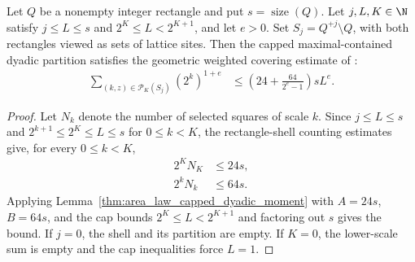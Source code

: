 \begin{lemma}
    \label{thm:area_law_rectangle_shell_weighted_cover}
    \leanok
    Let $Q$ be a nonempty integer rectangle and put $s=\operatorname{size}(Q)$. Let $j,L,K\in\N$
    satisfy $j\le L\le s$ and $2^K\le L<2^{K+1}$, and let $e>0$.
    Set $S_j=Q^{+j}\setminus Q$, with both rectangles viewed as sets of
    lattice sites. Then the capped maximal-contained dyadic partition satisfies the
    geometric weighted covering estimate of
    \cite[proof of Proposition~9.5, lines~717--729]{OpenAI2026AreaLaw}:
    \begin{align}
        \sum_{(k,z)\in\mathcal P_K(S_j)}(2^k)^{1+e}
         & \le \left(24+\frac{64}{2^e-1}\right)sL^e.
    \end{align}
\end{lemma}
\begin{proof}
    \leanok
    Let $N_k$ denote the number of selected squares of scale $k$.
    Since $j\le L\le s$ and $2^{k+1}\le2^K\le L\le s$ for $0\le k<K$,
    the rectangle-shell counting estimates give, for every $0\le k<K$,
    \begin{align}
        2^K N_K & \le24s, \\
        2^k N_k & \le64s.
    \end{align}
    Applying Lemma~\ref{thm:area_law_capped_dyadic_moment} with $A=24s$,
    $B=64s$, and the cap bounds $2^K\le L<2^{K+1}$ and factoring out $s$
    gives the bound.
    If $j=0$, the shell and its partition are empty. If $K=0$, the
    lower-scale sum is empty and the cap inequalities force $L=1$.
\end{proof}
